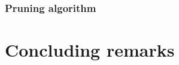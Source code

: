 \documentclass[11pt,a4paper]{article}
\newcommand{\PROMPT}[1]{ }
\begin{document}
\PROMPT{}

\subsubsection{Pruning algorithm}
\PROMPT{}



\section{Concluding remarks}

\PROMPT{}







 

\end{document}
